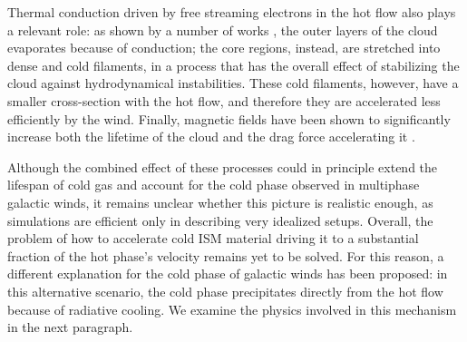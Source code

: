 Thermal conduction driven by free streaming electrons in the hot flow also plays a relevant role: as shown by a number of works \citep[e.g.,][]{bruggen2016launching}, the outer layers of the cloud evaporates because of conduction; the core regions, instead, are stretched into dense and cold filaments, in a process that has the overall effect of stabilizing the cloud against hydrodynamical instabilities. These cold filaments, however, have a smaller cross-section with the hot flow, and therefore they are accelerated less efficiently by the wind. Finally, magnetic fields have been shown to significantly increase both the lifetime of the cloud and the drag force accelerating it \citep{mccourt2015magnetized}.

Although the combined effect of these processes could in principle extend the lifespan of cold gas and account for the cold phase observed in multiphase galactic winds, it remains unclear whether this picture is realistic enough, as simulations are efficient only in describing very idealized setups. Overall, the problem of how to accelerate cold ISM material driving it to a substantial fraction of the hot phase's velocity remains yet to be solved. For this reason, a different explanation for the cold phase of galactic winds has been proposed: in this alternative scenario, the cold phase precipitates directly from the hot flow because of radiative cooling. We examine the physics involved in this mechanism in the next paragraph.




